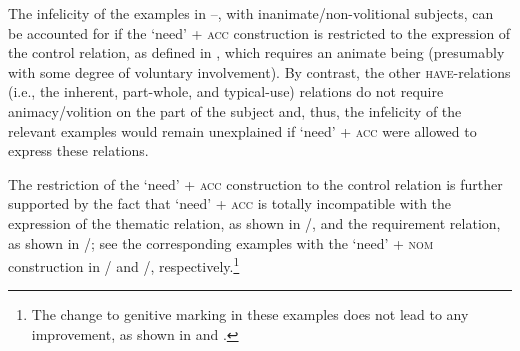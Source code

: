 \documentclass[output=paper,colorlinks,citecolor=brown]{langscibook}
\begin{document}
\noindent The infelicity of the examples in --, with inanimate/non-volitional subjects, can be accounted for if the `need' + \textsc{acc} construction is restricted to the expression of the control relation, as defined in \citet{Vikner.Jensen2002}, which requires an animate being (presumably with some degree of voluntary involvement). By contrast, the other \textsc{have}-relations (i.e., the inherent, part-whole, and typical-use) relations do not require animacy/volition on the part of the subject and, thus, the infelicity of the relevant examples would remain unexplained if `need' + \textsc{acc} were allowed to express these relations.

The restriction of the `need' + \textsc{acc} construction to the control relation is further supported by the fact that `need' + \textsc{acc} is totally incompatible with the expression of the thematic relation, as shown in /, and the requirement relation, as shown in /; see the corresponding examples with the `need' + \textsc{nom} construction in / and /, respectively.\footnote{The change to genitive marking in these examples does not lead to any improvement, as shown in  and .

\ea
{}
\z\z
}

\ea
{}
\z\z
\end{document}

